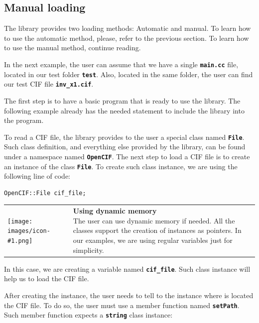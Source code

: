 \documentclass[11pt,twoside,openany,x11names,svgnames]{memoir}
\makeatletter
\newcommand{\IconNote}[3]
{
	\begin{table}[ht]
	\begin{tabular}{ lm{\dimexpr\textwidth-8\tabcolsep-\wd0}@{}}
		\toprule
		\texttt{[image: images/icon-\#1.png]}
		&
		\parbox[t]{155mm}{
		\textbf{#2} \\
		#3
		}
	\end{tabular}
\end{table}
}
\makeatother
\begin{document}
\subsection{Manual loading}\label{Manual-loading}

The library provides two loading methods: Automatic and manual. To learn how to use the automatic method, please, refer to the previous section. To learn how to use the manual method, continue reading.

In the next example, the user can assume that we have a single \textbf{\texttt{main.cc}} file, located in our test folder \textbf{\texttt{test}}. Also, located in the same folder, the user can find our test CIF file \textbf{\texttt{inv\_x1.cif}}.

The first step is to have a basic program that is ready to use the library. The following example already has the needed statement to include the library into the program.



To read a CIF file, the library provides to the user a special class named \textbf{\texttt{File}}. Such class definition, and everything else provided by the library, can be found under a namespace named \textbf{\texttt{OpenCIF}}. The next step to load a CIF file is to create an instance of the class \textbf{\texttt{File}}. To create such class instance, we are using the following line of code:

\begin{lstlisting}[frame=single,style=CPPStyle]
OpenCIF::File cif_file;
\end{lstlisting}

\IconNote
	{info}
	{Using dynamic memory}
	{The user can use dynamic memory if needed. All the classes support the creation of instances as pointers. In our examples, we are using regular variables just for simplicity.}

In this case, we are creating a variable named \textbf{\texttt{cif\_file}}. Such class instance will help us to load the CIF file.

After creating the instance, the user needs to tell to the instance where is located the CIF file. To do so, the user must use a member function named \textbf{\texttt{setPath}}. Such member function expects a \textbf{\texttt{string}} class instance:
\end{document}
